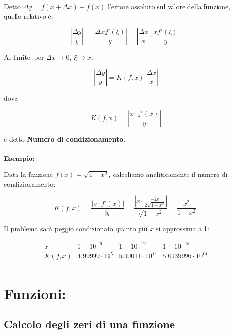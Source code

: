 \documentclass[a4paper, 11pt]{article}
\begin{document}
        Detto \( \Delta y = f(x + \Delta x) - f(x) \) l'errore assoluto sul valore della funzione, quello relativo è:

        \[
            \left| \frac{\Delta y}{y} \right| = \left| \frac{\Delta x f'(\xi)}{y} \right| = \left| \frac{\Delta x}{x} \cdot \frac{x f'(\xi)}{y} \right|.
        \]

        Al limite, per \( \Delta x \to 0 \), \( \xi \to x \):

        \[
            \left| \frac{\Delta y}{y} \right| = K(f, x) \left| \frac{\Delta x}{x} \right|
        \]

        dove:

        \[
            K(f, x) = \left| \frac{x \cdot f'(x)}{y} \right|
        \]

        è detto \textbf{Numero di condizionamento}.

        \paragraph{}
        \textbf{Esempio:}

        Data la funzione \( f(x) = \sqrt{1 - x^2} \), calcoliamo analiticamente il numero di condizionamento:


        \[
            K(f, x) = \frac{|x \cdot f'(x)|}{|y|} = \frac{|x \cdot \frac{-2x}{2\sqrt{1 - x^2}}|}{\sqrt{1 - x^2}} = \frac{x^2}{1 - x^2}.
        \]



        Il problema sarà peggio condizionato quanto più \( x \) si approssima a 1:

        \[
        \begin{array}{c|c|c|c|c}
            x & 1 - 10^{-6} & 1 - 10^{-12} & 1 - 10^{-15} \\ \hline
            K(f, x) & 4.99999 \cdot 10^5 & 5.00011 \cdot 10^{11} & 5.0039996 \cdot 10^{14} \\
        \end{array}
        \]

        

        \section{Funzioni:}
        \subsection{Calcolo degli zeri di una funzione}
        
\end{document}

